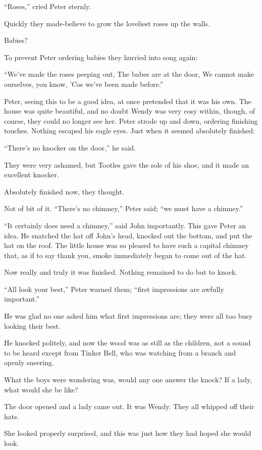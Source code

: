 ``Roses,'' cried Peter sternly.

Quickly they made-believe to grow the loveliest roses up the walls.

Babies?

To prevent Peter ordering babies they hurried into song again:

``We've made the roses peeping out,
    The babes are at the door,
We cannot make ourselves, you know,
    'Cos we've been made before.''

Peter, seeing this to be a good idea, at once pretended that it was his
own. The house was quite beautiful, and no doubt Wendy was very cosy
within, though, of course, they could no longer see her. Peter strode
up and down, ordering finishing touches. Nothing escaped his eagle
eyes. Just when it seemed absolutely finished:

``There's no knocker on the door,'' he said.

They were very ashamed, but Tootles gave the sole of his shoe, and it
made an excellent knocker.

Absolutely finished now, they thought.

Not of bit of it. ``There's no chimney,'' Peter said; ``we must have a
chimney.''

``It certainly does need a chimney,'' said John importantly. This gave
Peter an idea. He snatched the hat off John's head, knocked out the
bottom, and put the hat on the roof. The little house was so pleased to
have such a capital chimney that, as if to say thank you, smoke
immediately began to come out of the hat.

Now really and truly it was finished. Nothing remained to do but to
knock.

``All look your best,'' Peter warned them; ``first impressions are awfully
important.''

He was glad no one asked him what first impressions are; they were all
too busy looking their best.

He knocked politely, and now the wood was as still as the children, not
a sound to be heard except from Tinker Bell, who was watching from a
branch and openly sneering.

What the boys were wondering was, would any one answer the knock? If a
lady, what would she be like?

The door opened and a lady came out. It was Wendy. They all whipped off
their hats.

She looked properly surprised, and this was just how they had hoped she
would look.

